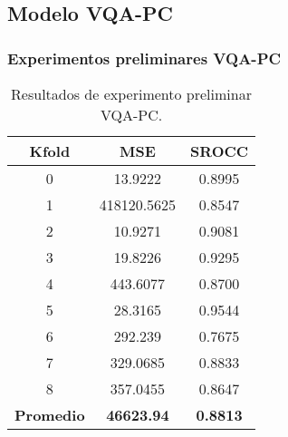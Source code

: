 \subsection{Modelo VQA-PC}

\begin{frame}
  \frametitle{Experimentos preliminares VQA-PC}
\begin{table}[htp]
  \small
  \begin{center}
    \begin{tabular}[c]{|c|c|c|}
      \hline
      \rowcolor[HTML]{FFC702}
      \textbf{Kfold} & \textbf{MSE} & \textbf{SROCC} \\ 
      \hline 
      0 & 13.9222 & 0.8995 \\
      \hline 
      1 & 418120.5625 & 0.8547 \\ 
      \hline 
      2 & 10.9271 & 0.9081 \\
      \hline 
      3 & 19.8226 & 0.9295 \\ 
      \hline 
      4 & 443.6077 & 0.8700 \\ 
      \hline 
      5 & 28.3165 & 0.9544 \\ 
      \hline 
      6 & 292.239 & 0.7675 \\ 
      \hline 
      7 & 329.0685 & 0.8833 \\ 
      \hline 
      8 & 357.0455 & 0.8647 \\ 
      \hline
      \textbf{\cellcolor[HTML]{FFC702}Promedio} & \textbf{46623.94} & \textbf{0.8813} \\ 
      \hline
    \end{tabular}
  \end{center}
  \caption[Resultados de experimento preliminar VQA-PC.]{
    Resultados de experimento preliminar VQA-PC\footnotemark[13]. 
  }
  \label{tab:PreTestResults}
\end{table}
\end{frame}


